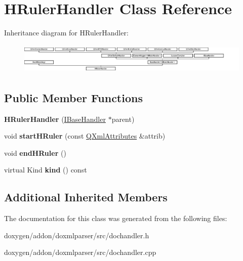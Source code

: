 \hypertarget{class_h_ruler_handler}{}\section{H\+Ruler\+Handler Class Reference}
\label{class_h_ruler_handler}
Inheritance diagram for H\+Ruler\+Handler\+:\begin{figure}[H]
\begin{center}
\leavevmode
\includegraphics[height=1.481482cm]{class_h_ruler_handler}
\end{center}
\end{figure}
\subsection*{Public Member Functions}
\begin{DoxyCompactItemize}
\item 
\mbox{\label{class_h_ruler_handler_a19eb453c8d1d2fbfffc5a8f0f5cf8790}} 
{\bfseries H\+Ruler\+Handler} (\mbox{\hyperlink{class_i_base_handler}{I\+Base\+Handler}} $\ast$parent)
\item 
\mbox{\label{class_h_ruler_handler_a099ec48d57adb88fd8cd0804b725e34f}} 
void {\bfseries start\+H\+Ruler} (const \mbox{\hyperlink{class_q_xml_attributes}{Q\+Xml\+Attributes}} \&attrib)
\item 
\mbox{\label{class_h_ruler_handler_a6b417768b7b9433b8ab8c4bb77a07bd7}} 
void {\bfseries end\+H\+Ruler} ()
\item 
\mbox{\label{class_h_ruler_handler_ae8edaf0baf873a4b19b066dcaafe5166}} 
virtual Kind {\bfseries kind} () const
\end{DoxyCompactItemize}
\subsection*{Additional Inherited Members}


The documentation for this class was generated from the following files\+:\begin{DoxyCompactItemize}
\item 
doxygen/addon/doxmlparser/src/dochandler.\+h\item 
doxygen/addon/doxmlparser/src/dochandler.\+cpp\end{DoxyCompactItemize}
